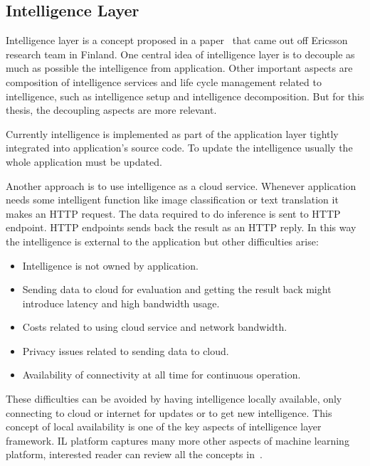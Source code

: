 \documentclass[english, 12pt, a4paper, elec, utf8, online]{aaltothesis}
\begin{document}


\subsection{Intelligence Layer}
Intelligence layer is a concept proposed in a paper~\cite{edgar2019} that came out off Ericsson research team in Finland. One central idea of intelligence layer is to decouple as much as possible the intelligence from application. Other important aspects are composition of intelligence services and life cycle management related to intelligence, such as intelligence setup and intelligence decomposition. But for this thesis, the decoupling aspects are more relevant.

Currently intelligence is implemented as part of the application layer tightly integrated into application's source code. To update the intelligence usually the whole application must be updated. 

Another approach is to use intelligence as a cloud service. Whenever application needs some intelligent function like image classification or text translation it makes an HTTP request. The data required to do inference is sent to HTTP endpoint. HTTP endpoints sends back the result as an HTTP reply. In this way the intelligence is external to the application but other difficulties arise:

\begin{itemize}
\item
Intelligence is not owned by application.
\item
Sending data to cloud for evaluation and getting the result back might introduce latency and high bandwidth usage.
\item
Costs related to using cloud service and network bandwidth.
\item
Privacy issues related to sending data to cloud.
\item 
Availability of connectivity at all time for continuous operation.  
\end{itemize} 

These difficulties can be avoided by having intelligence locally available, only connecting to cloud or internet for updates or to get new intelligence. This concept of local availability is one of the key aspects of  intelligence layer framework. IL platform captures many more other aspects of machine learning platform, interested reader can review all the concepts in~\cite{edgar2019}.               
\end{document}
